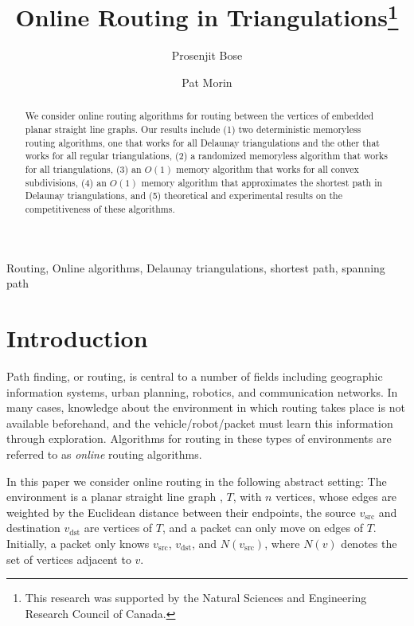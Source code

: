 \documentclass[final]{siamltex}
\title{Online Routing in Triangulations\thanks{This research was
	supported by the Natural Sciences and Engineering Research
	Council of Canada.}}
\author{Prosenjit Bose\footnotemark[2] \and
	Pat Morin\footnotemark[2]}
\date{}
\newcommand{\comment}[1]{}
\newcommand{\vsrc}{v_\mathrm{src}}
\newcommand{\vdest}{v_\mathrm{dst}}
\newcommand{\neigb}[1]{\mathit{N(#1)}}
\begin{document}
\maketitle

\renewcommand{\thefootnote}{\fnsymbol{footnote}}


\renewcommand{\thefootnote}{\arabic{footnote}}

\begin{abstract}
We consider online routing algorithms for routing between the vertices
of embedded planar straight line graphs.  Our results include (1) two
deterministic memoryless routing algorithms, one that works for all
Delaunay triangulations and the other that works for all regular
triangulations, (2) a randomized memoryless algorithm that works for
all triangulations, (3) an $O(1)$ memory algorithm that works for all
convex subdivisions, (4) an $O(1)$ memory algorithm that approximates
the shortest path in Delaunay triangulations, and (5) theoretical and
experimental results on the competitiveness of these algorithms.
\end{abstract}

\begin{keywords}
Routing, Online algorithms, Delaunay triangulations, shortest path, 
	spanning path
\end{keywords}

\comment{
\begin{AMS}
What goes in here?
\end{AMS} }

\section{Introduction}

Path finding, or routing, is central to a number of fields including
geographic information systems, urban planning, robotics, and
communication networks.  In many cases, knowledge about the
environment in which routing takes place is not available beforehand,
and the vehicle/robot/packet must learn this information through
exploration.  Algorithms for routing in these types of environments
are referred to as {\em online\/} \cite{hy98} routing algorithms.

In this paper we consider online routing in the following abstract
setting: The environment is a planar straight line graph \cite{ps85},
$T$, with $n$ vertices, whose edges are weighted by the Euclidean
distance between their endpoints, the source $\vsrc$ and destination
$\vdest$ are vertices of $T$, and a packet can only move on edges of
$T$.  Initially, a packet only knows $\vsrc$, $\vdest$, and
$\neigb{\vsrc}$, where $\neigb{v}$ denotes the set of vertices
adjacent to $v$.
\end{document}

